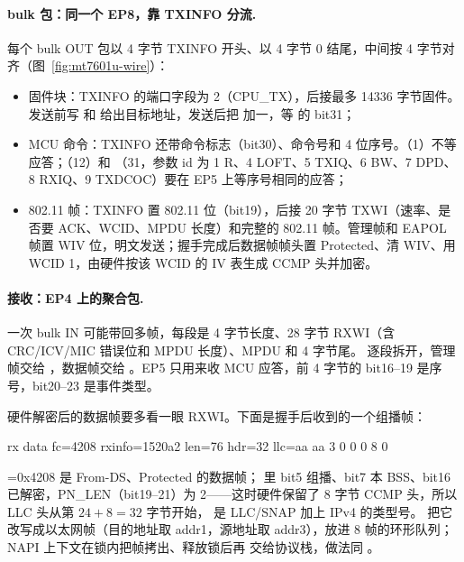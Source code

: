 \paragraph{bulk 包：同一个 EP8，靠 TXINFO 分流.} 每个 bulk OUT 包以 4 字节 TXINFO 开头、以 4 字节 0 结尾，中间按 4 字节对齐（图~\ref{fig:mt7601u-wire}）：

\begin{itemize}
  \item 固件块：TXINFO 的端口字段为 2（CPU\_TX），后接最多 14336 字节固件。发送前写  和  给出目标地址，发送后把  加一，等  的 bit31；
  \item MCU 命令：TXINFO 还带命令标志（bit30）、命令号和 4 位序号。（1）不等应答；（12）和 （31，参数 id 为 1 R、4 LOFT、5 TXIQ、6 BW、7 DPD、8 RXIQ、9 TXDCOC）要在 EP5 上等序号相同的应答；
  \item 802.11 帧：TXINFO 置 802.11 位（bit19），后接 20 字节 TXWI（速率、是否要 ACK、WCID、MPDU 长度）和完整的 802.11 帧。管理帧和 EAPOL 帧置 WIV 位，明文发送；握手完成后数据帧帧头置 Protected、清 WIV、用 WCID 1，由硬件按该 WCID 的 IV 表生成 CCMP 头并加密。
\end{itemize}

\paragraph{接收：EP4 上的聚合包.} 一次 bulk IN 可能带回多帧，每段是 4 字节长度、28 字节 RXWI（含 CRC/ICV/MIC 错误位和 MPDU 长度）、MPDU 和 4 字节尾。 逐段拆开，管理帧交给 ，数据帧交给 。EP5 只用来收 MCU 应答，前 4 字节的 bit16--19 是序号，bit20--23 是事件类型。

硬件解密后的数据帧要多看一眼 RXWI。下面是握手后收到的一个组播帧：
\begin{txtcode}
rx data fc=4208 rxinfo=1520a2 len=76 hdr=32 llc=aa aa 3 0 0 0 8 0
\end{txtcode}
=0x4208 是 From-DS、Protected 的数据帧； 里 bit5 组播、bit7 本 BSS、bit16 已解密，PN\_LEN（bit19--21）为 2——这时硬件保留了 8 字节 CCMP 头，所以 LLC 头从第 $24+8=32$ 字节开始， 是 LLC/SNAP 加上 IPv4 的类型号。 把它改写成以太网帧（目的地址取 addr1，源地址取 addr3），放进 8 帧的环形队列；NAPI 上下文在锁内把帧拷出、释放锁后再  交给协议栈，做法同 。

